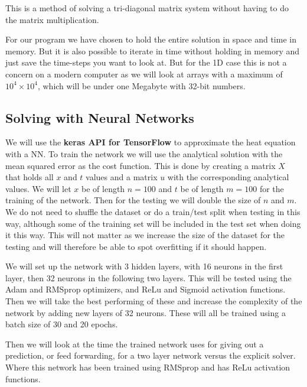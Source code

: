     This is a
    method of solving a tri-diagonal matrix system without having to do the matrix
    multiplication. 
    
    For our program we have chosen to hold the entire solution in space and time in
    memory. But it is also possible to iterate in time without holding in memory
    and just save the time-steps you want to look at. But for the 1D case this is
    not a concern on a modern computer as we will look at arrays with a maximum of
    $10^4\times 10^4$, which will be under one Megabyte with 32-bit numbers.
   
\subsection{Solving with Neural Networks}
We will use the \textbf{keras API for TensorFlow} to approximate the heat
equation with a NN. To train the network we will use the analytical solution
with the mean squared error as the cost function. This is done by creating a
matrix $X$ that holds all $x$ and $t$ values and a matrix $u$ with the
corresponding analytical values. We will let $x$ be of length $n=100$ and $t$
be of length $m=100$ for the training of the network. Then for the testing we
will double the size of $n$ and $m$. We do not need to shuffle the dataset or
do a train/test split when testing in this way, although some of the training
set will be included in the test set when doing it this way. This will not matter
as we increase the size of the dataset for the testing and will therefore be
able to spot overfitting if it should happen.

We will set up the network
with 3 hidden layers, with 16 neurons in the first layer, then 32 neurons in
the following two layers. This will be tested using the Adam and RMSprop
optimizers, and ReLu and Sigmoid activation functions. Then we will take the
best performing of these and increase the complexity of the network by adding
new layers of 32 neurons. These will all be trained using a batch size of 30
and 20 epochs.

Then we will look at the time the trained network uses for giving out a
prediction, or feed forwarding, for a two layer network versus the explicit solver. 
Where this network has been trained using RMSprop and has ReLu activation functions.







